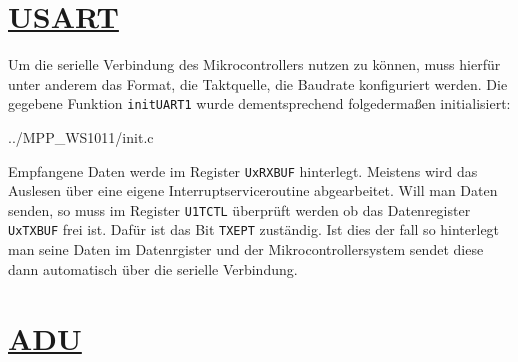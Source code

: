 \documentclass[11pt,german]{scrartcl}
\begin{document}





\clearpage
\section*
{\href{http://cst.mi.fu-berlin.de/intern/19606-P-MPP/Aufgaben/040700.html}
{USART}}

Um die serielle Verbindung des Mikrocontrollers nutzen zu können, muss hierfür unter anderem das Format, die Taktquelle, die Baudrate konfiguriert werden. Die gegebene Funktion \texttt{initUART1} wurde dementsprechend folgedermaßen initialisiert:

{../MPP_WS1011/init.c}

Empfangene Daten werde im Register \texttt{UxRXBUF} hinterlegt. Meistens wird das Auslesen über eine eigene Interruptserviceroutine abgearbeitet. Will man Daten senden, so muss im Register \texttt{U1TCTL} überprüft werden ob das Datenregister \texttt{UxTXBUF} frei ist. Dafür ist das Bit \texttt{TXEPT} zuständig. Ist dies der fall so hinterlegt man seine Daten im Datenrgister und der Mikrocontrollersystem sendet diese dann automatisch über die serielle Verbindung.





\clearpage
\section*
{\href{http://cst.mi.fu-berlin.de/intern/19606-P-MPP/Aufgaben/040800.html}
{ADU}}


\end{document}
